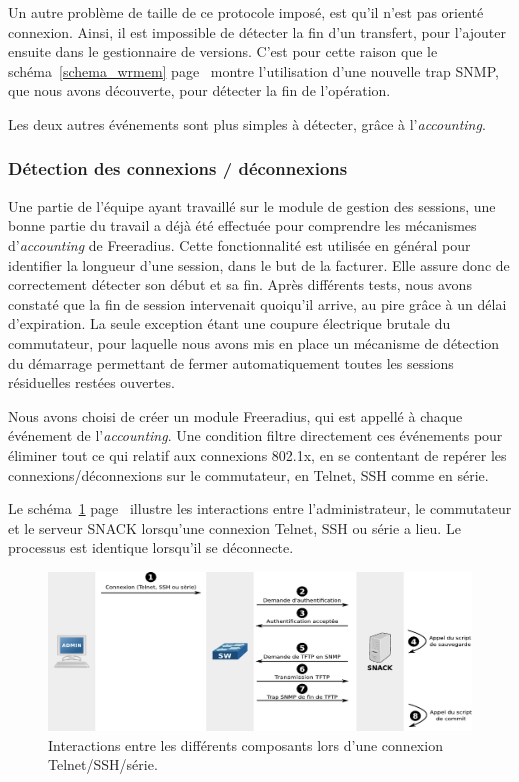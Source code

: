 Un autre problème de taille de ce protocole imposé, est qu'il n'est pas orienté connexion. Ainsi, il est impossible de détecter la fin d'un transfert, pour l'ajouter ensuite dans le gestionnaire de versions. C'est pour cette raison que le schéma~\ref{schema_wrmem} page~\pageref{schema_wrmem} montre l'utilisation d'une nouvelle trap SNMP, que nous avons découverte, pour détecter la fin de l'opération.

Les deux autres événements sont plus simples à détecter, grâce à l'\emph{accounting}.

\subsubsection{Détection des connexions / déconnexions}
\label{accounting}

Une partie de l'équipe ayant travaillé sur le module de gestion des sessions, une bonne partie du travail a déjà été effectuée pour comprendre les mécanismes d'\emph{accounting} de Freeradius. Cette fonctionnalité est utilisée en général pour identifier la longueur d'une session, dans le but de la facturer. Elle assure donc de correctement détecter son début et sa fin. Après différents tests, nous avons constaté que la fin de session intervenait quoiqu'il arrive, au pire grâce à un délai d'expiration. La seule exception étant une coupure électrique brutale du commutateur, pour laquelle nous avons mis en place un mécanisme de détection du démarrage permettant de fermer automatiquement toutes les sessions résiduelles restées ouvertes.

Nous avons choisi de créer un module Freeradius, qui est appellé à chaque événement de l'\emph{accounting}. Une condition filtre directement ces événements pour éliminer tout ce qui relatif aux connexions 802.1x, en se contentant de repérer les connexions/déconnexions sur le commutateur, en Telnet, SSH comme en série.

Le schéma~\ref{schema_auth} page~\pageref{schema_auth} illustre les interactions entre l'administrateur, le commutateur et le serveur SNACK lorsqu'une connexion Telnet, SSH ou série a lieu. Le processus est identique lorsqu'il se déconnecte.

\begin{figure}[!h]
	\begin{center}
	    \includegraphics[width=\textwidth]{img/auth.pdf}
	\end{center}
	\caption{Interactions entre les différents composants lors d'une connexion Telnet/SSH/série.}
	\label{schema_auth}
\end{figure}

